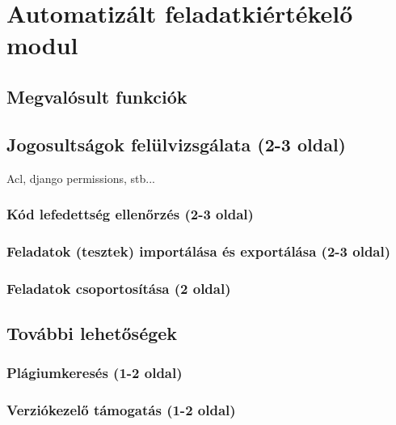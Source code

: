 \chapter{Automatizált feladatkiértékelő modul}\label{chapter:exercise}

\section{Megvalósult funkciók}
\section{Jogosultságok felülvizsgálata (2-3 oldal)}
Acl, django permissions, stb...

\subsection{Kód lefedettség ellenőrzés (2-3 oldal)}

\subsection{Feladatok (tesztek) importálása és exportálása (2-3 oldal)}

\subsection{Feladatok csoportosítása (2 oldal)}

\section{További lehetőségek}

\subsection{Plágiumkeresés (1-2 oldal)}

\subsection{Verziókezelő támogatás (1-2 oldal)}